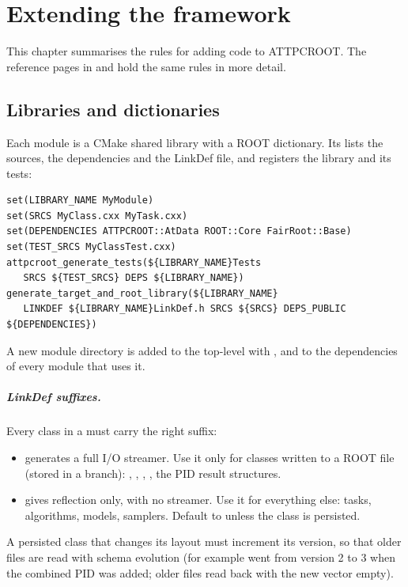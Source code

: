 \chapter{Extending the framework}
\label{ch:development}

This chapter summarises the rules for adding code to ATTPCROOT. The reference pages in 
and  hold the same rules in more detail.

\section{Libraries and dictionaries}

Each module is a CMake shared library with a ROOT dictionary. Its  lists the sources, the
dependencies and the LinkDef file, and registers the library and its tests:
\begin{verbatim}
set(LIBRARY_NAME MyModule)
set(SRCS MyClass.cxx MyTask.cxx)
set(DEPENDENCIES ATTPCROOT::AtData ROOT::Core FairRoot::Base)
set(TEST_SRCS MyClassTest.cxx)
attpcroot_generate_tests(${LIBRARY_NAME}Tests
   SRCS ${TEST_SRCS} DEPS ${LIBRARY_NAME})
generate_target_and_root_library(${LIBRARY_NAME}
   LINKDEF ${LIBRARY_NAME}LinkDef.h SRCS ${SRCS} DEPS_PUBLIC ${DEPENDENCIES})
\end{verbatim}
A new module directory is added to the top-level  with , and
 to the dependencies of every module that uses it.

\paragraph{LinkDef suffixes.} Every class in a  must carry the right suffix:
\begin{itemize}
\item {} generates a full I/O streamer. Use it only for classes written to a ROOT file (stored in a
  branch): , , , , the PID result structures.
\item {} gives reflection only, with no streamer. Use it for everything else: tasks, algorithms,
  models, samplers. Default to \code{-!} unless the class is persisted.
\end{itemize}
A persisted class that changes its layout must increment its  version, so that older files are read
with schema evolution (for example  went from version 2 to 3 when the combined PID was added; older
files read back with the new vector empty).

